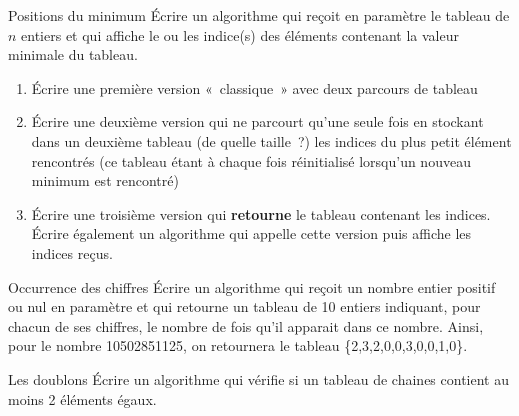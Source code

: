 	\begin{Exercice}{Positions du minimum}
		Écrire un algorithme qui reçoit en paramètre le tableau
		 de $n$ entiers et qui
		affiche le ou les indice(s) des éléments 
		contenant la valeur minimale du tableau.
	
		\begin{enumerate}[label=\alph*)]
		\item 
			Écrire une première version «~classique~» avec deux parcours de tableau
		\item
			Écrire une deuxième version qui ne parcourt qu’une seule fois 
			 en
			stockant dans un deuxième tableau (de quelle taille~?)
			les indices du plus petit élément
			rencontrés (ce tableau étant à chaque fois réinitialisé lorsqu’un
			nouveau minimum est rencontré)
		\item
			Écrire une troisième version qui \textbf{retourne} 
			le tableau contenant les indices.
			Écrire également un algorithme 
			qui appelle cette version puis affiche les indices reçus. 
		\end{enumerate}
	\end{Exercice}
	
	\begin{Exercice}{Occurrence des chiffres}
		Écrire un algorithme qui reçoit 
		un nombre entier positif ou nul en paramètre
		et qui retourne un tableau de 10 entiers
		indiquant, pour chacun de ses chiffres, 
		le nombre de fois qu’il apparait dans ce nombre. 
		Ainsi, pour le nombre 10502851125, on retournera
		le tableau \{2,3,2,0,0,3,0,0,1,0\}.
	\end{Exercice}
	
	\begin{Exercice}{Les doublons}
		Écrire un algorithme qui vérifie 
		si un tableau de chaines
		contient au moins 2 éléments égaux.
	\end{Exercice}	
	\bigskip
	
